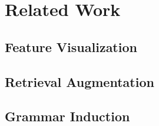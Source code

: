 
\chapter{Related Work}
\section{Feature Visualization}
\section{Retrieval Augmentation}
\section{Grammar Induction}